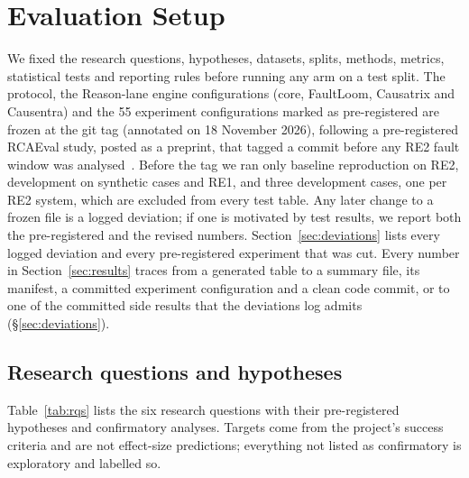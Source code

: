 \section{Evaluation Setup}
\label{sec:eval}

We fixed the research questions, hypotheses, datasets, splits, methods, metrics, statistical tests and reporting rules before running any \sys arm on a test split.
The protocol, the Reason-lane engine configurations (core, FaultLoom, Causatrix and Causentra) and the 55 experiment configurations marked as pre-registered are frozen at the git tag  (annotated on 18 November 2026), following a pre-registered RCAEval study, posted as a preprint, that tagged a commit before any RE2 fault window was analysed~\cite{hussain2026prereg}.
Before the tag we ran only baseline reproduction on RE2, development on synthetic cases and RE1, and three development cases, one per RE2 system, which are excluded from every test table.
Any later change to a frozen file is a logged deviation; if one is motivated by test results, we report both the pre-registered and the revised numbers.
Section~\ref{sec:deviations} lists every logged deviation and every pre-registered experiment that was cut.
Every number in Section~\ref{sec:results} traces from a generated table to a summary file, its manifest, a committed experiment configuration and a clean code commit, or to one of the committed side results that the deviations log admits (\S\ref{sec:deviations}).

\subsection{Research questions and hypotheses}
\label{sec:rqs}

Table~\ref{tab:rqs} lists the six research questions with their pre-registered hypotheses and confirmatory analyses.
Targets come from the project's success criteria and are not effect-size predictions; everything not listed as confirmatory is exploratory and labelled so.

